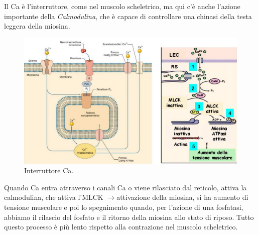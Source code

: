 \documentclass[a4paper,12pt]{article}
\newcommand{\lfreccia}{\ensuremath{\longrightarrow}}
\begin{document}
Il Ca è l'interruttore, come nel muscolo scheletrico, ma qui c'è anche l'azione importante della \emph{Calmodulina}, che è capace di controllare una chinasi della testa leggera della miosina.
\begin{figure}[H]
\centering
\includegraphics[scale=0.4]{immagine/interruttore.jpg}
\caption{Interruttore Ca.}
\end{figure}

Quando Ca entra attraverso i canali Ca o viene rilasciato dal reticolo, attiva la calmodulina, che attiva l'MLCK \lfreccia attivazione della miosina, si ha aumento di tensione muscolare e poi lo spegnimento quando, per l'azione di una fosfatasi, abbiamo il rilascio del fosfato e il ritorno della miosina allo stato di riposo. Tutto questo processo è più lento rispetto alla contrazione nel muscolo scheletrico.
\end{document}
